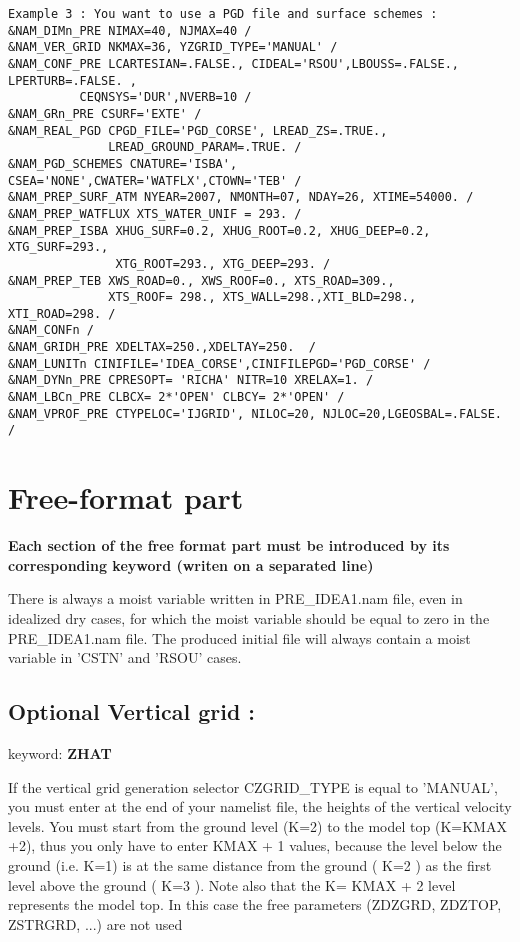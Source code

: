\begin{verbatim}
Example 3 : You want to use a PGD file and surface schemes :
&NAM_DIMn_PRE NIMAX=40, NJMAX=40 /
&NAM_VER_GRID NKMAX=36, YZGRID_TYPE='MANUAL' /
&NAM_CONF_PRE LCARTESIAN=.FALSE., CIDEAL='RSOU',LBOUSS=.FALSE., LPERTURB=.FALSE. ,
	      CEQNSYS='DUR',NVERB=10 /
&NAM_GRn_PRE CSURF='EXTE' /
&NAM_REAL_PGD CPGD_FILE='PGD_CORSE', LREAD_ZS=.TRUE., 
              LREAD_GROUND_PARAM=.TRUE. /
&NAM_PGD_SCHEMES CNATURE='ISBA', CSEA='NONE',CWATER='WATFLX',CTOWN='TEB' /
&NAM_PREP_SURF_ATM NYEAR=2007, NMONTH=07, NDAY=26, XTIME=54000. /
&NAM_PREP_WATFLUX XTS_WATER_UNIF = 293. /
&NAM_PREP_ISBA XHUG_SURF=0.2, XHUG_ROOT=0.2, XHUG_DEEP=0.2, XTG_SURF=293.,
               XTG_ROOT=293., XTG_DEEP=293. / 
&NAM_PREP_TEB XWS_ROAD=0., XWS_ROOF=0., XTS_ROAD=309.,
              XTS_ROOF= 298., XTS_WALL=298.,XTI_BLD=298., XTI_ROAD=298. /
&NAM_CONFn /              
&NAM_GRIDH_PRE XDELTAX=250.,XDELTAY=250.  / 
&NAM_LUNITn CINIFILE='IDEA_CORSE',CINIFILEPGD='PGD_CORSE' /   
&NAM_DYNn_PRE CPRESOPT= 'RICHA' NITR=10 XRELAX=1. /
&NAM_LBCn_PRE CLBCX= 2*'OPEN' CLBCY= 2*'OPEN' /
&NAM_VPROF_PRE CTYPELOC='IJGRID', NILOC=20, NJLOC=20,LGEOSBAL=.FALSE. /
\end{verbatim}
            


\section{ Free-format part }

{\bf Each section of the free format part must be introduced by its corresponding
keyword (writen on a separated line)}


There is always a moist variable written in PRE\_IDEA1.nam file, even in idealized dry
cases, for which  the moist variable should be equal to zero in the PRE\_IDEA1.nam file.
The produced initial file will always contain a moist variable  in 'CSTN'
and 'RSOU' cases.
 

\subsection{Optional Vertical grid : }
\label{ZHAT}
keyword: {\bf ZHAT}

If the vertical grid generation selector CZGRID\_TYPE is equal to 'MANUAL',  
you must enter at the end of your namelist file, the heights of the vertical
velocity levels. You must start from the ground level (K=2) to the model top
(K=KMAX +2), thus you only have to enter  KMAX + 1 values, because the level below the
ground (i.e. K=1) is at the same distance from the ground ( K=2 ) as the first
level above the ground ( K=3 ). Note also that the K= KMAX + 2 level represents
the model top. In this case the free parameters (ZDZGRD, ZDZTOP, ZSTRGRD, ...)
are not used


